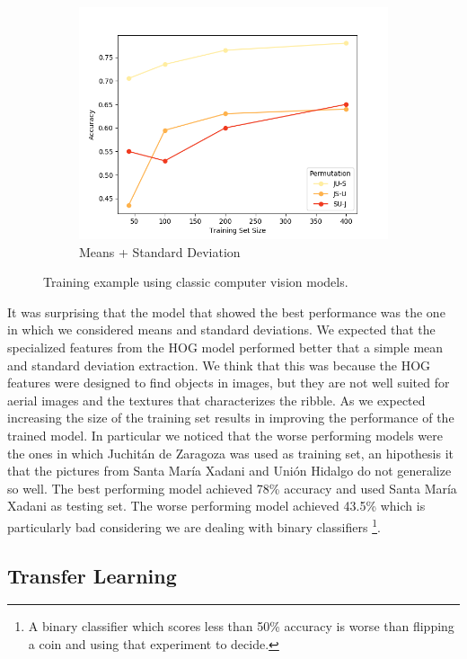 \begin{figure}[ht]
\begin{subfigure}{.49\textwidth}
        \includegraphics[width=\textwidth]{images/classic-meanstd.png}
        \caption{Means + Standard Deviation}
    \end{subfigure}
  
  \caption{Training example using classic computer vision models.}
  \label{fig:classic}
\end{figure}

It was surprising that the model that showed the best performance was the one in which we considered means and standard deviations. We expected that the specialized features from the HOG model performed better that a simple mean and standard deviation extraction. We think that this was because the HOG features were designed to find objects in images, but they are not well suited for aerial images and the textures that characterizes the ribble. As we expected increasing the size of the training set results in improving the performance of the trained model. In particular we noticed that the worse performing models were the ones in which Juchit\'an de Zaragoza was used as training set, an hipothesis it that the pictures from Santa Mar\'ia Xadani and Unión Hidalgo do not generalize so well. The best performing model achieved 78\% accuracy and used Santa María Xadani as testing set. The worse performing model achieved 43.5\% which is particularly bad considering we are dealing with binary classifiers \footnote{A binary classifier which scores less than 50\% accuracy is worse than flipping a coin and using that experiment to decide.}.

\subsection{Transfer Learning}

